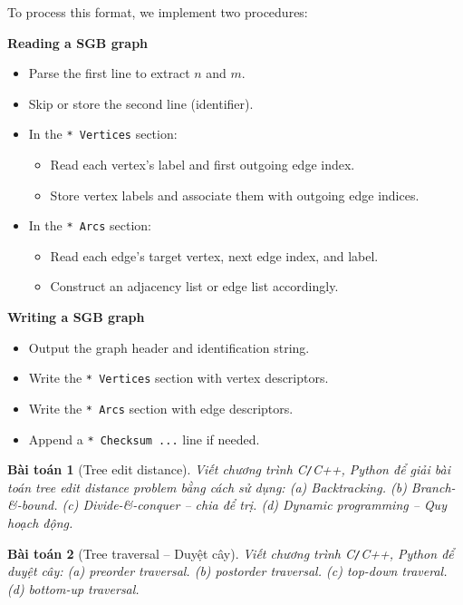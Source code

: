 \documentclass{article}
\newtheorem{baitoan}{Bài toán}
\begin{document}
To process this format, we implement two procedures:

\textbf{Reading a SGB graph}
\begin{itemize}
    \item Parse the first line to extract $n$ and $m$.
    \item Skip or store the second line (identifier).
    \item In the \texttt{* Vertices} section:
    \begin{itemize}
        \item Read each vertex’s label and first outgoing edge index.
        \item Store vertex labels and associate them with outgoing edge indices.
    \end{itemize}
    \item In the \texttt{* Arcs} section:
    \begin{itemize}
        \item Read each edge’s target vertex, next edge index, and label.
        \item Construct an adjacency list or edge list accordingly.
    \end{itemize}
\end{itemize}

\textbf{Writing a SGB graph}
\begin{itemize}
    \item Output the graph header and identification string.
    \item Write the \texttt{* Vertices} section with vertex descriptors.
    \item Write the \texttt{* Arcs} section with edge descriptors.
    \item Append a \texttt{* Checksum ...} line if needed.
\end{itemize}

\begin{baitoan}[Tree edit distance]
    Viết chương trình {\sf C{\tt/}C++, Python} để giải bài toán tree edit distance problem bằng cách sử dụng: (a) Backtracking. (b) Branch-\&-bound. (c) Divide-\&-conquer -- chia để trị. (d) Dynamic programming -- Quy hoạch động.
\end{baitoan}

\begin{baitoan}[Tree traversal -- Duyệt cây]
    Viết chương trình {\sf C{\tt/}C++, Python} để duyệt cây: (a) preorder traversal. (b) postorder traversal. (c) top-down traveral. (d) bottom-up traversal.
\end{baitoan}
\end{document}
